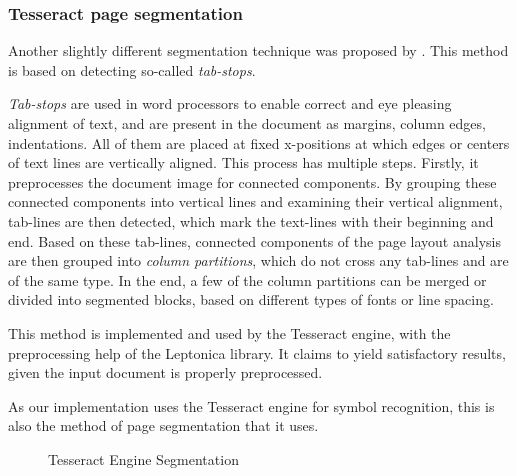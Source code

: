 \subsubsection{Tesseract page segmentation}

Another slightly different segmentation technique was proposed by \citet{tesseractSegmentationTab}. This method is based on detecting so-called \emph{tab-stops}.

\emph{Tab-stops} are used in word processors to enable correct and eye pleasing alignment of text, and are present in the document as margins, column edges, indentations. All of them are placed at fixed x-positions at which edges or centers of text lines are vertically aligned. This process has multiple steps. Firstly, it preprocesses the document image for connected components. By grouping these connected components into vertical lines and examining their vertical alignment, tab-lines are then detected, which mark the text-lines with their beginning and end. Based on these tab-lines, connected components of the page layout analysis are then grouped into \emph{column partitions}, which do not cross any tab-lines and are of the same type. In the end, a few of the column partitions can be merged or divided into segmented blocks, based on different types of fonts or line spacing. 

This method is implemented and used by the Tesseract engine, with the preprocessing help of the Leptonica library. It claims to yield satisfactory results, given the input document is properly preprocessed.

As our implementation uses the Tesseract engine for symbol recognition, this is also the method of page segmentation that it uses.

\begin{figure}
    \noindent
	\caption{Tesseract Engine Segmentation}
	\label{fig:mff}
\end{figure}

